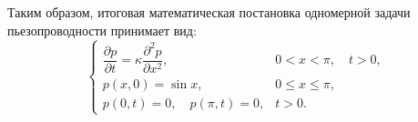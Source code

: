 \documentclass[12pt, a4paper]{article}
\begin{document}
Таким образом, итоговая математическая постановка одномерной задачи пьезопроводности принимает вид:
\begin{equation}
    \begin{cases}
        \dfrac{\partial p}{\partial t} = \kappa \dfrac{\partial^2 p}{\partial x^2}, & 0 < x < \pi, \quad t > 0, \\[6pt]
        p(x, 0) = \sin x, & 0 \le x \le \pi, \\[4pt]
        p(0, t) = 0, \quad p(\pi, t) = 0, & t > 0.
    \end{cases}
\end{equation}






\end{document}
